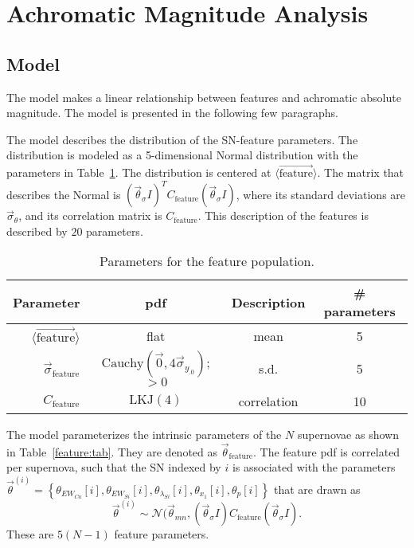 \documentclass{aastex61}   	%
\begin{document}
\section{Achromatic Magnitude Analysis}
\label{magnitude:sec}
\subsection{Model}
\label{achromaticmodel:sec}
The model makes a linear relationship between features and achromatic absolute magnitude.  The model
is presented in the following few paragraphs. 

The model describes the distribution of the SN-feature parameters.  The distribution is modeled as a
5-dimensional Normal distribution
with the parameters in Table~\ref{population:tab}.  The distribution is centered at $\langle \overrightarrow{\text{feature}}\rangle$.
The matrix
that describes the Normal is $(\vec{\theta}_{\sigma}I)^T C_{\text{feature}}  (\vec{\theta}_{\sigma}I)$, where
its standard deviations are $\vec{\sigma}_{\theta}$,
and its correlation matrix is $C_{\text{feature}}$.
This description of the features is described by $20$ parameters.
\begin{table}
\begin{center}
\caption{Parameters for the feature population. \label{population:tab}}
\begin{tabular}{rccc}
\hline
Parameter & pdf & Description & \# parameters\\ \hline
$\langle \overrightarrow{\text{feature}}\rangle$ & flat  &  mean & 5\\
$\vec{\sigma}_{\text{feature}}$ & $\text{Cauchy}(\vec{0},4\vec{\sigma}_{y_{.0}})$; $>0$  &  s.d. & 5\\
$C_{\text{feature}}$ & $\text{LKJ}(4)$ &  correlation & 10\\
\hline
\end{tabular}
\end{center}
\end{table}

The model parameterizes the intrinsic parameters of the $N$ supernovae as shown in Table~\ref{feature:tab}.
They are denoted as $\vec{\theta}_{\mathrm{feature}}$.
The feature pdf is correlated per supernova, such that the SN indexed by $i$ is associated with the parameters
$\vec{\theta}^{(i)}=\left\{\theta_{EW_{Ca}}[i], \theta_{EW_{Si}}[i], \theta_{\lambda_{Si}}[i], \theta_{x_1}[i], \theta_{p}[i] \right\}$
that are drawn as
\begin{equation}
\vec{\theta}^{(i)} \sim \mathcal{N}(\vec{\theta}_{\mathit{mn}}, (\vec{\theta}_{\sigma}I) C_{\text{feature}}  (\vec{\theta}_{\sigma}I).
\label{feature:pdf}
\end{equation}
These are $5(N-1)$ feature parameters.
\end{document}
